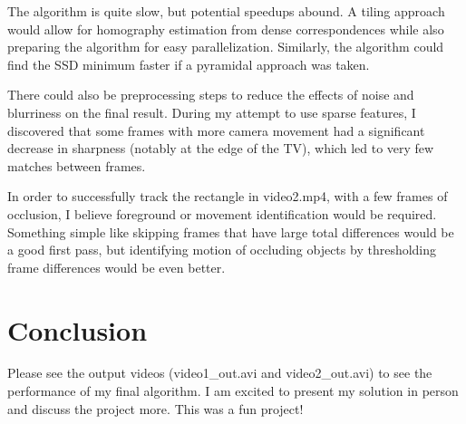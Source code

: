 \documentclass{article}
\begin{document}
The algorithm is quite slow, but potential speedups abound. A tiling approach would allow for homography estimation from dense correspondences while also preparing the algorithm for easy parallelization. Similarly, the algorithm could find the SSD minimum faster if a pyramidal approach was taken.

There could also be preprocessing steps to reduce the effects of noise and blurriness on the final result. During my attempt to use sparse features, I discovered that some frames with more camera movement had a significant decrease in sharpness (notably at the edge of the TV), which led to very few matches between frames.

In order to successfully track the rectangle in video2.mp4, with a few frames of occlusion, I believe foreground or movement identification would be required. Something simple like skipping frames that have large total differences would be a good first pass, but identifying motion of occluding objects by thresholding frame differences would be even better.

\section{Conclusion}

Please see the output videos (video1_out.avi and video2_out.avi) to see the performance of my final algorithm. I am excited to present my solution in person and discuss the project more. This was a fun project!
\end{document}
